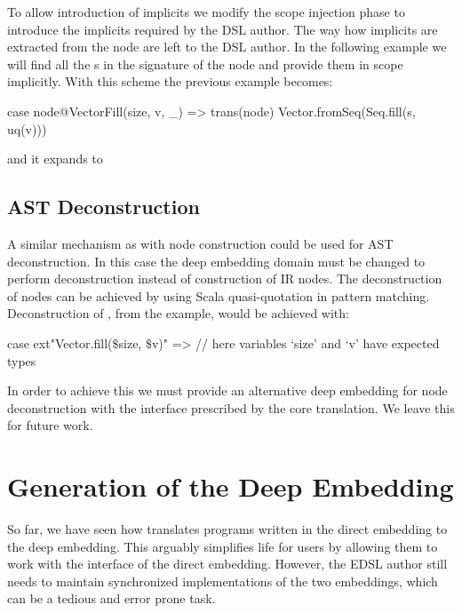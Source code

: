 To allow introduction of implicits we modify the scope injection phase to introduce the
implicits required by the DSL author. The way how implicits are extracted from the node
are left to the DSL author. In the following example we will find all the s
in the signature of the node and provide them in scope implicitly. With this scheme
the previous example becomes:\begin{lstparagraph}
case node@VectorFill(size, v, _) => trans(node) {
  Vector.fromSeq(Seq.fill(s, uq(v)))
}
\end{lstparagraph}
and it expands to\begin{lstparagraph}
case node @ VectorFill(size, v, _) =>
  class T // A synthetic class
  implicit val impl$\$$0 = node.tpe.asInstanceOf[TypeTag[T]]
  val v$\$$1 = v.asInstanceOf[$\tau$(T)]

  lift[Vector].fromSeq(lift[Seq].fill(s, v$\$$1))
}
\end{lstparagraph}


\section{AST Deconstruction}
\label{sec:yy-ast-deconstruction}

A similar mechanism as with node construction could be used for AST deconstruction. In this case the
 deep embedding domain must be changed to perform deconstruction instead of construction of IR nodes.
 The deconstruction of nodes can be achieved by using Scala quasi-quotation in pattern matching. Deconstruction
 of , from the example, would be achieved with:\begin{lstparagraph}
 case ext"Vector.fill($\$$size, $\$$v)" =>
   // here variables `size' and `v' have expected types
 \end{lstparagraph}


 In order to achieve this we must provide an alternative deep embedding for
  node deconstruction with the interface prescribed by the core translation. We
  leave this for future work.





\chapter{Generation of the Deep Embedding}
\label{sec:deep-gen}

So far, we have seen how \yy translates programs written in the
direct embedding to the deep embedding. This arguably simplifies life
for \edsl users by allowing them to work with the interface of the
direct embedding.  However, the EDSL author still needs to maintain synchronized
 implementations of the two embeddings, which can be a tedious and error prone task.

